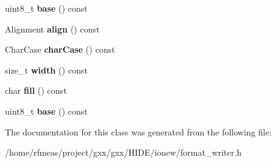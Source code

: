 \begin{DoxyCompactItemize}
\item 
uint8\+\_\+t {\bfseries base} () const \hypertarget{classgxx_1_1io_1_1EmptySpec_ad9da604f2910a176e53ba009d0f9fc98}{}\label{classgxx_1_1io_1_1EmptySpec_ad9da604f2910a176e53ba009d0f9fc98}

\item 
Alignment {\bfseries align} () const \hypertarget{classgxx_1_1io_1_1EmptySpec_aea647109fcd983c2dd48a5dd55e768fa}{}\label{classgxx_1_1io_1_1EmptySpec_aea647109fcd983c2dd48a5dd55e768fa}

\item 
Char\+Case {\bfseries char\+Case} () const \hypertarget{classgxx_1_1io_1_1EmptySpec_ac81567b47cbfcf4d96e8d3044f48ccd5}{}\label{classgxx_1_1io_1_1EmptySpec_ac81567b47cbfcf4d96e8d3044f48ccd5}

\item 
size\+\_\+t {\bfseries width} () const \hypertarget{classgxx_1_1io_1_1EmptySpec_a4ca4033e8409d934c762f5c8c6c13a46}{}\label{classgxx_1_1io_1_1EmptySpec_a4ca4033e8409d934c762f5c8c6c13a46}

\item 
char {\bfseries fill} () const \hypertarget{classgxx_1_1io_1_1EmptySpec_aa5f6882502c0bb1b73785029c4a54072}{}\label{classgxx_1_1io_1_1EmptySpec_aa5f6882502c0bb1b73785029c4a54072}

\item 
uint8\+\_\+t {\bfseries base} () const \hypertarget{classgxx_1_1io_1_1EmptySpec_ad9da604f2910a176e53ba009d0f9fc98}{}\label{classgxx_1_1io_1_1EmptySpec_ad9da604f2910a176e53ba009d0f9fc98}

\end{DoxyCompactItemize}


The documentation for this class was generated from the following file\+:\begin{DoxyCompactItemize}
\item 
/home/rfmeas/project/gxx/gxx/\+H\+I\+D\+E/ionew/format\+\_\+writer.\+h\end{DoxyCompactItemize}
